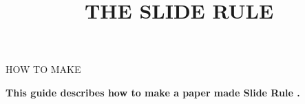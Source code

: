 
\newcommand{\makefulltitle}{How To Make The Slide Rule }



\title{\fontsize{60}{60}\selectfont THE SLIDE RULE}
\preauthor{}\postauthor{}\author{}
\predate{}\postdate{}\date{}


  \begin{center}
    \headingfont\fontsize{32}{32}\selectfont HOW TO MAKE
  \end{center}

  {\let\newpage\relax\maketitle}%
  \nosection{}
  \large\textbf{\makeperex This guide describes how to make a paper made Slide Rule \modelname.}

